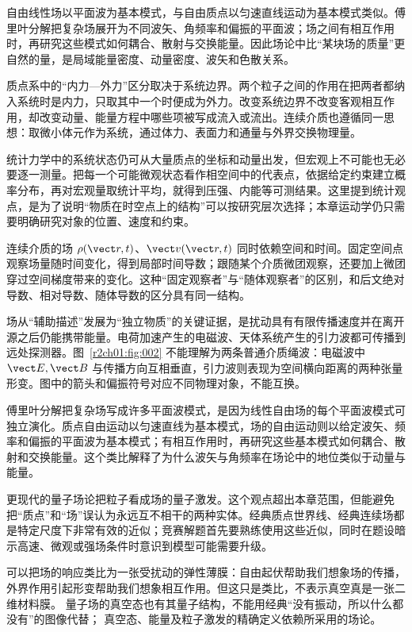 自由线性场以平面波为基本模式，与自由质点以匀速直线运动为基本模式类似。傅里叶分解把复杂场展开为不同波矢、角频率和偏振的平面波；场之间有相互作用时，再研究这些模式如何耦合、散射与交换能量。因此场论中比“某块场的质量”更自然的量，是局域能量密度、动量密度、波矢和色散关系。

质点系中的“内力—外力”区分取决于系统边界。两个粒子之间的作用在把两者都纳入系统时是内力，只取其中一个时便成为外力。改变系统边界不改变客观相互作用，却改变动量、能量方程中哪些项被写成流入或流出。连续介质也遵循同一思想：取微小体元作为系统，通过体力、表面力和通量与外界交换物理量。

统计力学中的系统状态仍可从大量质点的坐标和动量出发，但宏观上不可能也无必要逐一测量。把每一个可能微观状态看作相空间中的代表点，依据给定约束建立概率分布，再对宏观量取统计平均，就得到压强、内能等可测结果。这里提到统计观点，是为了说明“物质在时空点上的结构”可以按研究层次选择；本章运动学仍只需要明确研究对象的位置、速度和约束。

连续介质的场 $\rho(\vect r,t)$、$\vect v(\vect r,t)$ 同时依赖空间和时间。固定空间点观察场量随时间变化，得到局部时间导数；跟随某个介质微团观察，还要加上微团穿过空间梯度带来的变化。这种“固定观察者”与“随体观察者”的区别，和后文绝对导数、相对导数、随体导数的区分具有同一结构。

场从“辅助描述”发展为“独立物质”的关键证据，是扰动具有有限传播速度并在离开源之后仍能携带能量。电荷加速产生的电磁波、天体系统产生的引力波都可传播到远处探测器。图~\ref{r2ch01:fig:002} 不能理解为两条普通介质绳波：电磁波中 $\vect E,\vect B$ 与传播方向互相垂直，引力波则表现为空间横向距离的两种张量形变。图中的箭头和偏振符号对应不同物理对象，不能互换。

傅里叶分解把复杂场写成许多平面波模式，是因为线性自由场的每个平面波模式可独立演化。质点自由运动以匀速直线为基本模式，场的自由运动则以给定波矢、频率和偏振的平面波为基本模式；有相互作用时，再研究这些基本模式如何耦合、散射和交换能量。这个类比解释了为什么波矢与角频率在场论中的地位类似于动量与能量。

更现代的量子场论把粒子看成场的量子激发。这个观点超出本章范围，但能避免把“质点”和“场”误认为永远互不相干的两种实体。经典质点世界线、经典连续场都是特定尺度下非常有效的近似；竞赛解题首先要熟练使用这些近似，同时在题设暗示高速、微观或强场条件时意识到模型可能需要升级。

可以把场的响应类比为一张受扰动的弹性薄膜：自由起伏帮助我们想象场的传播，
外界作用引起形变帮助我们想象相互作用。但这只是类比，不表示真空真是一张二维材料膜。
量子场的真空态也有其量子结构，不能用经典“没有振动，所以什么都没有”的图像代替；
真空态、能量及粒子激发的精确定义依赖所采用的场论。

